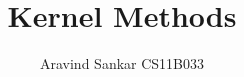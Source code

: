 \documentclass{article}
\begin{document}
\title{\textbf{Kernel Methods }
\\
}
\author{Aravind Sankar CS11B033 \\[0.2in]
}

\maketitle
\end{document}

